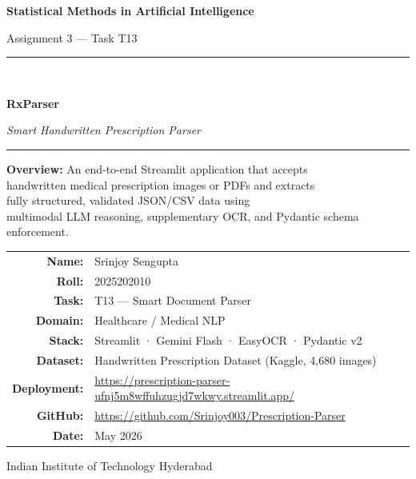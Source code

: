 \documentclass[12pt,a4paper]{article}
\begin{document}
\begin{titlepage}
    \centering
    \vspace*{1.5cm}
    {\LARGE\bfseries Statistical Methods in Artificial Intelligence\par}
    \vspace{0.4cm}
    {\large Assignment 3 — Task T13\par}
    \vspace{1.5cm}
    \rule{\linewidth}{1.5pt}\\[0.4cm]
    {\Huge\bfseries RxParser\par}
    {\Large\itshape Smart Handwritten Prescription Parser\par}
    \rule{\linewidth}{1.5pt}
    \vspace{1.5cm}

    {\large
        \textbf{Overview:} An end-to-end Streamlit application that accepts\\
        handwritten medical prescription images or PDFs and extracts\\
        fully structured, validated JSON/CSV data using\\
        multimodal LLM reasoning, supplementary OCR, and Pydantic schema enforcement.
    \par}

    \vspace{2cm}
            \begin{tabular}{rp{11cm}}
                                                                        \textbf{Name:}      & Srinjoy Sengupta \\[4pt]
                                                                        \textbf{Roll:}      & 2025202010 \\[4pt]
                        \textbf{Task:}      & T13 — Smart Document Parser \\[4pt]
                        \textbf{Domain:}    & Healthcare / Medical NLP \\[4pt]
                        \textbf{Stack:}     & Streamlit · Gemini Flash · EasyOCR · Pydantic v2 \\[4pt]
                  \textbf{Dataset:}   & Handwritten Prescription Dataset (Kaggle, 4{,}680 images) \\[4pt]
                        \textbf{Deployment:} & \url{https://prescription-parser-ufnj5m8wffuhzugjd7wkwy.streamlit.app/} \\[4pt]
                        \textbf{GitHub:}     & \url{https://github.com/Srinjoy003/Prescription-Parser} \\[4pt]
                        \textbf{Date:}      & May 2026 \\
    \end{tabular}

    \vfill
    {\small Indian Institute of Technology Hyderabad}
\end{titlepage}
\end{document}
